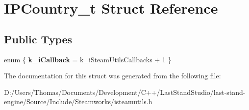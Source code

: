 \hypertarget{structIPCountry__t}{}\section{I\+P\+Country\+\_\+t Struct Reference}
\label{structIPCountry__t}
\subsection*{Public Types}
\begin{DoxyCompactItemize}
\item 
\hypertarget{structIPCountry__t_a057c53e0ddab3f07284fddf69c3ad355}{}enum \{ {\bfseries k\+\_\+i\+Callback} = k\+\_\+i\+Steam\+Utils\+Callbacks + 1
 \}\label{structIPCountry__t_a057c53e0ddab3f07284fddf69c3ad355}

\end{DoxyCompactItemize}


The documentation for this struct was generated from the following file\+:\begin{DoxyCompactItemize}
\item 
D\+:/\+Users/\+Thomas/\+Documents/\+Development/\+C++/\+Last\+Stand\+Studio/last-\/stand-\/engine/\+Source/\+Include/\+Steamworks/isteamutils.\+h\end{DoxyCompactItemize}
